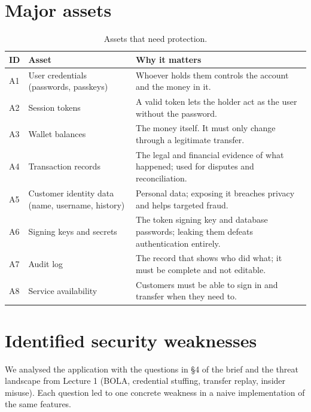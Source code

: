 \documentclass[11pt,a4paper]{article}
\begin{document}
\section{Major assets}

\begin{table}[H]
\centering\small
\caption{Assets that need protection.}
\begin{tabularx}{\textwidth}{lP{4.2cm}Y}
\toprule
ID & Asset & Why it matters \\
\midrule
A1 & User credentials (passwords, passkeys) & Whoever holds them controls the account and the money in it. \\
A2 & Session tokens & A valid token lets the holder act as the user without the password. \\
A3 & Wallet balances & The money itself. It must only change through a legitimate transfer. \\
A4 & Transaction records & The legal and financial evidence of what happened; used for disputes and reconciliation. \\
A5 & Customer identity data (name, username, history) & Personal data; exposing it breaches privacy and helps targeted fraud. \\
A6 & Signing keys and secrets & The token signing key and database passwords; leaking them defeats authentication entirely. \\
A7 & Audit log & The record that shows who did what; it must be complete and not editable. \\
A8 & Service availability & Customers must be able to sign in and transfer when they need to. \\
\bottomrule
\end{tabularx}
\end{table}

\section{Identified security weaknesses}
\label{sec:weak}

We analysed the application with the questions in \S4 of the brief and the threat landscape from Lecture 1 (BOLA, credential stuffing, transfer replay, insider misuse). Each question led to one concrete weakness in a naive implementation of the same features.
\end{document}
